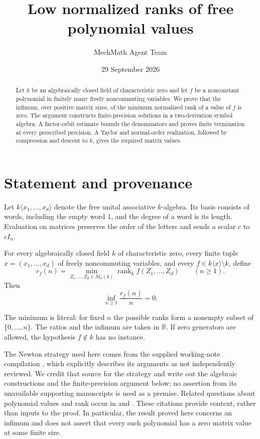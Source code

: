 \documentclass{article}
\title{Low normalized ranks of free polynomial values}
\author{MechMath Agent Team}
\date{29 September 2026}
\newcommand{\rank}{\operatorname{rank}}
\begin{document}
\maketitle
\begin{abstract}
Let $k$ be an algebraically closed field of characteristic zero and let $f$ be a nonconstant polynomial in finitely many freely noncommuting variables. We prove that the infimum, over positive matrix sizes, of the minimum normalized rank of a value of $f$ is zero. The argument constructs finite-precision solutions in a two-derivation symbol algebra. A factor-orbit estimate bounds the denominators and proves finite termination at every prescribed precision. A Taylor and normal-order realization, followed by compression and descent to $k$, gives the required matrix values.
\end{abstract}

\section{Statement and provenance}
Let $k\langle x_1,\ldots,x_d\rangle$ denote the free unital associative $k$-algebra. Its basis consists of words, including the empty word $1$, and the degree of a word is its length. Evaluation on matrices preserves the order of the letters and sends a scalar $c$ to $cI_n$.

\begin{theorem}\label{thm:main}
For every algebraically closed field $k$ of characteristic zero, every finite tuple $x=(x_1,\ldots,x_d)$ of freely noncommuting variables, and every
$f\in k\langle x\rangle\setminus k$, define
\[
 r_f(n)=\min_{Z_1,\ldots,Z_d\in M_n(k)}\rank_k f(Z_1,\ldots,Z_d)
 \qquad(n\geq1).
\]
Then
\[
 \inf_{n\geq1}\frac{r_f(n)}n=0.
\]
\end{theorem}

The minimum is literal: for fixed $n$ the possible ranks form a nonempty subset of $\{0,\ldots,n\}$. The ratios and the infimum are taken in $\mathbb R$. If zero generators are allowed, the hypothesis $f\notin k$ has no instance.

The Newton strategy used here comes from the supplied working-note compilation \citep{SuppliedSummary2026}, which explicitly describes its arguments as not independently reviewed. We credit that source for the strategy and write out the algebraic constructions and the finite-precision argument below; no assertion from its unavailable supporting manuscripts is used as a premise. Related questions about polynomial values and rank occur in \citet{RowenVishne2026} and \citet{BresarVolcic2025}. These citations provide context, rather than inputs to the proof. In particular, the result proved here concerns an infimum and does not assert that every such polynomial has a zero matrix value at some finite size.
\end{document}

